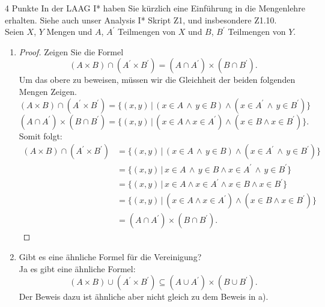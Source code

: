 \documentclass{problemset}
\begin{document}
\begin{problem}{4 Punkte}
In der LAAG I* haben Sie kürzlich eine Einführung in die Mengenlehre erhalten. Siehe
auch unser Analysis I* Skript Z1, und insbesondere Z1.10. \\
Seien $X$, $Y$ Mengen und $A$, $A^\prime$ Teilmengen von $X$ und $B$, $B^\prime$ Teilmengen von $Y$.
\begin{enumerate}
    \item[a)]
          \begin{proof}
              Zeigen Sie die Formel
              \begin{displaymath}
                  (A \times B) \cap (A^\prime \times B^\prime) = (A \cap A^\prime) \times (B \cap B^\prime).
              \end{displaymath}
              Um das obere zu beweisen, müssen wir die Gleichheit der beiden folgenden Mengen Zeigen.
              \[
                  (A \times B) \cap (A^\prime \times B^\prime) = \{(x,y)\,|\,( x \in A \, \land \, y\in B) \land (x \in A^\prime \, \land \, y \in B^\prime)\}
              \]
              \[
                  (A \cap A^\prime) \times (B \cap B^\prime) = \{(x,y)\,|\,(x \in A \land x \in A^\prime) \land (x \in B \land x \in B^\prime)\}.
              \]
              Somit folgt:
              \begin{align}
                  (A \times B) \cap (A^\prime \times B^\prime) & = \{(x,y)\,|\,( x \in A \, \land \, y\in B) \land (x \in A^\prime \, \land \, y \in B^\prime)\} \\
                                                               & = \{(x,y)\,|\,x \in A \, \land \, y\in B \land x \in A^\prime \, \land \, y \in B^\prime\}      \\
                                                               & = \{(x,y)\,|\,x \in A \land x \in A^\prime \land x \in B \land x \in B^\prime\}                 \\
                                                               & = \{(x,y)\,|\,(x \in A \land x \in A^\prime) \land (x \in B \land x \in B^\prime)\}             \\
                                                               & =  (A \cap A^\prime) \times (B \cap B^\prime).
              \end{align}
          \end{proof}
    \item[b)] Gibt es eine ähnliche Formel für die Vereinigung? \\ Ja es gibt
          eine ähnliche Formel: \[
              (A \times B) \cup (A^\prime \times B^\prime) \subseteq (A \cup A^\prime) \times (B \cup B^\prime).
          \]
          Der Beweis dazu ist ähnliche aber nicht gleich zu dem Beweis in a).
\end{enumerate}
\end{problem}
\end{document}
